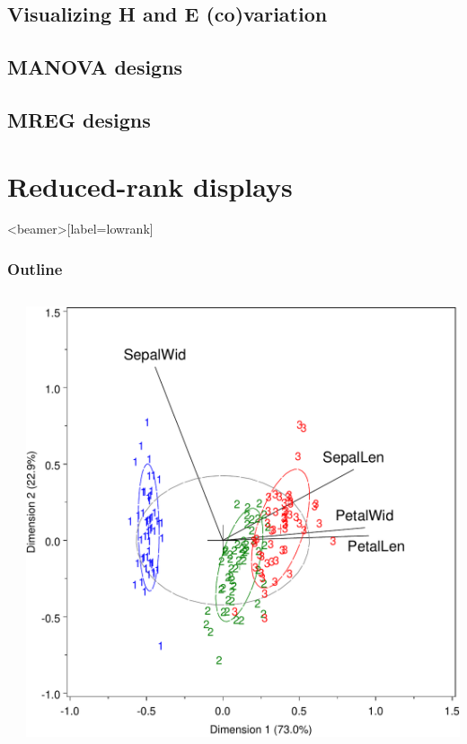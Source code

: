 \documentclass[10pt,t]{beamer}
\begin{document}
\subsection{Visualizing H and E (co)variation}

\subsection{MANOVA designs}

\subsection{MREG designs}


\section{Reduced-rank displays}
\begin{frame}<beamer>[label=lowrank]
  \frametitle{Outline}
	\begin{columns}[c]
	  \begin{column}{.6\textwidth}
	  \tableofcontents[currentsection]
	  \end{column}
	  \begin{column}{.4\textwidth}
	  \includegraphics[width=\textwidth]{fig/bipliris}
	  \end{column}
	\end{columns}
\end{frame}
\end{document}
